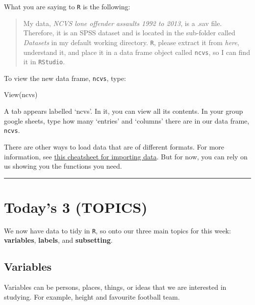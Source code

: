 \documentclass[
]{book}
\newenvironment{Shaded}{\begin{snugshade}}{\end{snugshade}}
\newcommand{\FunctionTok}[1]{\textcolor[rgb]{0.00,0.00,0.00}{#1}}
\newcommand{\NormalTok}[1]{#1}
\begin{document}
What you are saying to \texttt{R} is the following:

\begin{quote}
My data, \emph{NCVS lone offender assaults 1992 to 2013}, is a .sav file. Therefore, it is an SPSS dataset and is located in the sub-folder called \emph{Datasets} in my default working directory. \texttt{R}, please extract it from \emph{here}, understand it, and place it in a data frame object called \texttt{ncvs}, so I can find it in \texttt{RStudio}.
\end{quote}

To view the new data frame, \texttt{ncvs}, type:

\begin{Shaded}
\begin{Highlighting}[]
\FunctionTok{View}\NormalTok{(ncvs)}
\end{Highlighting}
\end{Shaded}

A tab appears labelled `ncvs'. In it, you can view all its contents. In your group google sheets, type how many `entries' and `columns' there are in our data frame, \texttt{ncvs}.

There are other ways to load data that are of different formats. For more information, see \href{https://evoldyn.gitlab.io/evomics-2018/ref-sheets/R_data-import.pdf}{this cheatsheet for importing data}. But for now, you can rely on us showing you the functions you need.

\begin{center}\rule{0.5\linewidth}{0.5pt}\end{center}

\hypertarget{todays-3-topics-1}{%
\section{Today's 3 (TOPICS)}\label{todays-3-topics-1}}

We now have data to tidy in \texttt{R}, so onto our three main topics for this week: \textbf{variables}, \textbf{labels}, and \textbf{subsetting}.

\hypertarget{variables}{%
\subsection{Variables}\label{variables}}

Variables can be persons, places, things, or ideas that we are interested in studying. For example, height and favourite football team.
\end{document}
